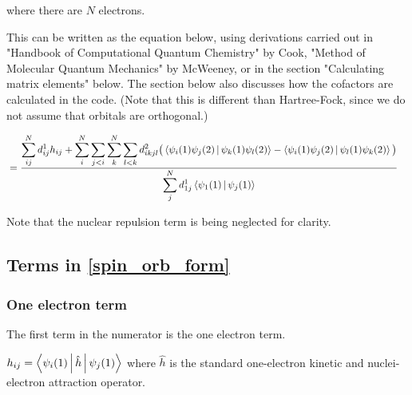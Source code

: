\documentclass[a4paper]{article}
\begin{document}
where there are $N$ electrons.

This can be written as the equation below, using derivations carried out in "Handbook of Computational Quantum Chemistry" by Cook, "Method of Molecular Quantum Mechanics" by McWeeney, or in the section "Calculating matrix elements" below. The section below also discusses how the cofactors are calculated in the code. (Note that this is different than Hartree-Fock, since we do not assume that orbitals are orthogonal.) 

\begin{equation}
 \begin{aligned}
  &=\frac{\displaystyle \sum_{ij}^{N} d^1_{ij} h_{ij}                                                                                                                                                            
     + \sum_i^{N}\sum_{j<i}\sum_k^{N}\sum_{l<k}                                                                                                                                                     
          d^2_{ikjl} \big(\Braket{  \psi_i(1) \psi_j(2) | \psi_k(1) \psi_l(2) }-\Braket{  \psi_i(1) \psi_j(2) | \psi_l(1) \psi_k(2) } \big) }{\displaystyle \sum_{j}^{N}  d^1_{1j} \Braket{\psi_1(1) | \psi_j(1)}  }
          \label{spin_orb_form}
     \end{aligned}
     \end{equation}

Note that the nuclear repulsion term is being neglected for clarity.

\subsection{Terms in \ref{spin_orb_form} }
\subsubsection{One electron term}
    The first term in the numerator is the one electron term.                                                                                                                                                                 
                                                                                                                                                                                                             
    $h_{ij} = \Braket{ \psi_i(1) | \hat{h} | \psi_j(1) }$ where $\hat{h}$ is the standard one-electron kinetic and nuclei-electron attraction operator.                                                                                                                                                                  
                                                                                                                                                                                                             
\end{document}
